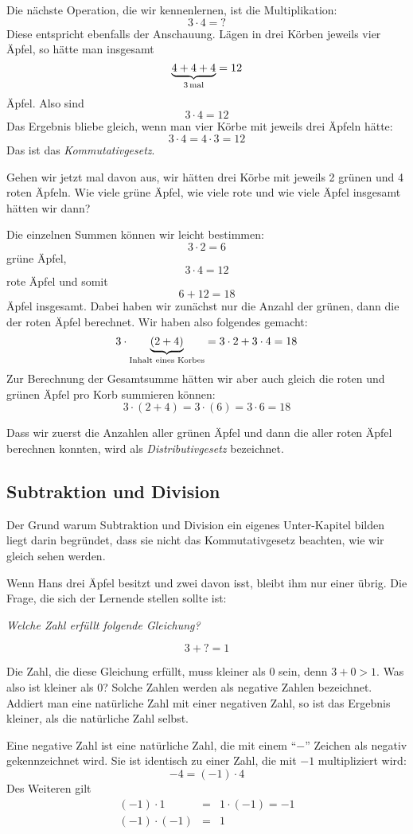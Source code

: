 Die nächste Operation, die wir kennenlernen, ist die Multiplikation:
\[3\cdot 4 = ?\]
Diese entspricht ebenfalls der Anschauung. Lägen in drei Körben jeweils vier Äpfel, so hätte man insgesamt
\[\underbrace{4+4+4}_{3 \, \textnormal{mal}} = 12\]
Äpfel. Also sind 
\[3\cdot 4 = 12\]
Das Ergebnis bliebe gleich, wenn man vier Körbe mit jeweils drei Äpfeln hätte:
\[3\cdot 4 = 4\cdot 3 = 12\]
Das ist das \textsl{Kommutativgesetz}.

Gehen wir jetzt mal davon aus, wir hätten drei Körbe mit jeweils 2 grünen und 4 roten Äpfeln. Wie viele grüne Äpfel, wie viele rote und wie viele Äpfel insgesamt hätten wir dann?

Die einzelnen Summen können wir leicht bestimmen: 
\[3\cdot 2 = 6\]
grüne Äpfel,
\[3\cdot 4 = 12 \]
rote Äpfel und somit
\[6+12 = 18\]
Äpfel insgesamt. Dabei haben wir zunächst nur die Anzahl der grünen, dann die der roten Äpfel berechnet. Wir haben also folgendes gemacht:
\[3\cdot \underbrace{(2+4)}_{\textnormal{Inhalt eines Korbes}} = 3\cdot 2 + 3\cdot 4 = 18\]
Zur Berechnung der Gesamtsumme hätten wir aber auch gleich die roten und grünen Äpfel pro Korb summieren können:
\[3\cdot (2+4) = 3\cdot (6) = 3\cdot 6 = 18 \]

Dass wir zuerst die Anzahlen aller grünen Äpfel und dann die aller roten Äpfel berechnen konnten, wird als  \textsl{Distributivgesetz} bezeichnet.

\subsection{Subtraktion und Division}

Der Grund warum Subtraktion und Division ein eigenes Unter-Kapitel bilden liegt darin begründet, dass sie nicht das Kommutativgesetz beachten, wie wir gleich sehen werden.

Wenn Hans drei Äpfel besitzt und zwei davon isst, bleibt ihm nur einer übrig. Die Frage, die sich der Lernende stellen sollte ist:

\textsl{Welche Zahl erfüllt folgende Gleichung?}

\[3 + ? = 1\]

Die Zahl, die diese Gleichung erfüllt, muss kleiner als 0 sein, denn $3+0 > 1$. Was also ist kleiner als 0? Solche Zahlen werden als negative Zahlen bezeichnet. Addiert man eine natürliche Zahl mit einer negativen Zahl, so ist das Ergebnis kleiner, als die natürliche Zahl selbst. 

\begin{definition}
Eine negative Zahl ist eine natürliche Zahl, die mit einem "`$-$"' Zeichen als negativ gekennzeichnet wird. Sie ist identisch zu einer Zahl, die mit $-1$ multipliziert wird:
\[ -4 = (-1) \cdot 4 \]
Des Weiteren gilt
\begin{eqnarray*}
(-1)\cdot 1 &=& 1\cdot (-1) = -1 \\
(-1)\cdot (-1) &=& 1
\end{eqnarray*}

\end{definition}

